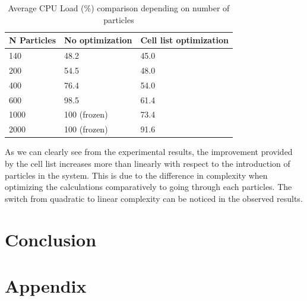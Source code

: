 \documentclass[]{usiinfbachelorproject}
\begin{document}
\begin{table}[h]
\centering
{} {
\begin{normalsize}\begin{tabular}{l|ll}
\textbf{N Particles} & \textbf{No optimization} & \textbf{Cell list optimization}\\
\hline
140 & 48.2 & 45.0 \\
200 & 54.5 & 48.0 \\
400 & 76.4 & 54.0 \\ 
600 & 98.5 & 61.4 \\
1000 & 100 (frozen) & 73.4\\
2000 & 100 (frozen) & 91.6 \\
\end{tabular}
\end{normalsize}
}
\caption{Average CPU Load (\%) comparison depending on number of particles}
\label{tab:CPULoad}
\end{table}
  
As we can clearly see from the experimental results, the improvement provided by the 
cell list increases more than linearly with respect to the introduction of particles in the system. 
This is due to the difference in complexity when 
optimizing the calculations comparatively to going through each particles. The switch from 
quadratic to linear complexity can be noticed in the observed results.

\newpage
\section{Conclusion}

\newpage
\section{Appendix}

\newpage


\end{document}
